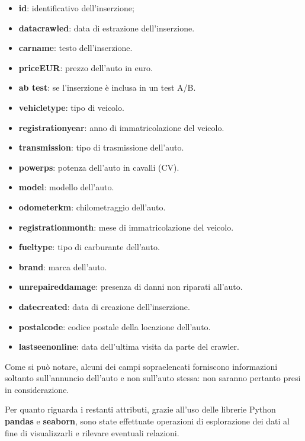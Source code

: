 \begin{itemize}
    \item \textbf{id}: identificativo dell'inserzione;
    \item \textbf{data\textunderscore crawled}: data di estrazione dell'inserzione.
    \item \textbf{car\textunderscore name}: testo dell'inserzione.
    \item \textbf{price\textunderscore EUR}: prezzo dell'auto in euro.
    \item \textbf{ab \textunderscore test}: se l'inserzione è inclusa in un test A/B.
    \item \textbf{vehicle\textunderscore type}: tipo di veicolo.
    \item \textbf{registration\textunderscore year}: anno di immatricolazione del veicolo.
    \item \textbf{transmission}: tipo di trasmissione dell'auto.
    \item \textbf{power\textunderscore ps}: potenza dell'auto in cavalli (CV).
    \item \textbf{model}: modello dell'auto. 
    \item \textbf{odometer\textunderscore km}: chilometraggio dell'auto.
    \item\textbf{registration\textunderscore month}: mese di immatricolazione del veicolo.
    \item \textbf{fuel\textunderscore type}: tipo di carburante dell'auto.
    \item \textbf{brand}: marca dell'auto.
    \item \textbf{unrepaired\textunderscore damage}: presenza di danni non riparati all'auto.
    \item \textbf{date\textunderscore created}: data di creazione dell'inserzione.
    \item \textbf{postal\textunderscore code}: codice postale della locazione dell'auto.
    \item \textbf{last\textunderscore seen\textunderscore online}: data dell'ultima visita da parte del crawler.
\end{itemize}
Come si può notare, alcuni dei campi sopraelencati forniscono informazioni soltanto sull'annuncio dell'auto e non sull'auto stessa: non saranno pertanto presi in considerazione.

Per quanto riguarda i restanti attributi, grazie all'uso delle librerie \mbox{Python} \textbf{pandas} e \textbf{seaborn}, sono state effettuate operazioni di esplorazione dei dati al fine di visualizzarli e rilevare eventuali relazioni.

